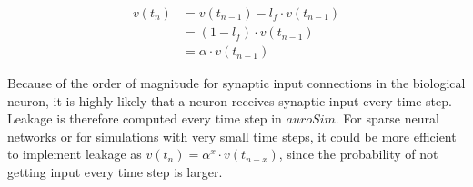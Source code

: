 \begin{equation}
	\begin{split}
		v(t_n) 	&= v(t_{n-1})-l_f \cdot v(t_{n-1})  	\\
				&= (1-l_f)\cdot v(t_{n-1}) 				\\
				&= \alpha \cdot v(t_{n-1})
	\end{split}
	\label{eqLeakageForLIF}
\end{equation}
		
		Because of the order of magnitude for synaptic input connections in the biological neuron, it is highly likely that a neuron receives synaptic input every time step.
		Leakage is therefore computed every time step in $auroSim$.
		For sparse neural networks or for simulations with very small time steps, it could be more efficient to implement leakage as $v(t_n) = \alpha^x \cdot v(t_{n-x})$,
			since the probability of not getting input every time step is larger.

